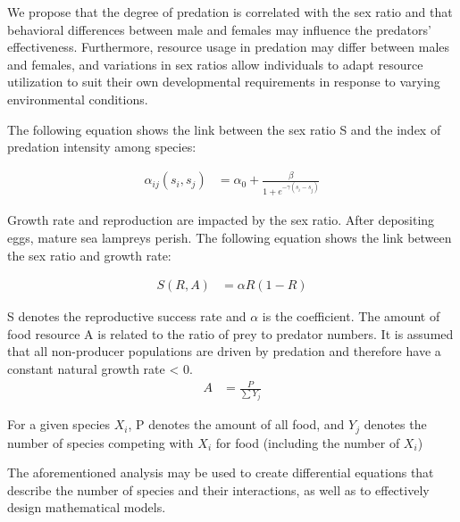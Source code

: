 \documentclass[12pt]{article}  %
\begin{document}
We propose that the degree of predation is correlated with the sex ratio and that behavioral differences between male and females may influence the predators' effectiveness. Furthermore, resource usage in predation may differ between males and females, and variations in sex ratios allow individuals to adapt resource utilization to suit their own developmental requirements in response to varying environmental conditions.\par
The following equation shows the link between the sex ratio S and the index of predation intensity among species:\par
\begin{equation}
	\begin{aligned}
		\alpha_{ij}(s_i, s_j) &= \alpha_0 + \frac{\beta}{1 + e^{-\gamma(s_i - s_j)}}
	\end{aligned}
\end{equation}
\par
Growth rate and reproduction are impacted by the sex ratio. After depositing eggs, mature sea lampreys perish. The following equation shows the link between the sex ratio and growth rate:\par
\begin{equation}
	\begin{aligned}
	S(R,A) &= \alpha R(1-R)
	\end{aligned}
\end{equation}
\par
S denotes the reproductive success rate and $\alpha$ is the coefficient. The amount of food resource A is related to the ratio of prey to predator numbers. It is assumed that all non-producer populations are driven by predation and therefore have a constant natural growth rate < 0. 
\begin{equation}
	\begin{aligned}
		A&=\frac{P}{\sum Y_j}
	\end{aligned}
\end{equation}
\par
For a given species $X_i$, P denotes the amount of all food, and $Y_j$ denotes the number of species competing with $X_i$ for food (including the number of $X_i$)
\par
The aforementioned analysis may be used to create differential equations that describe the number of species and their interactions, as well as to effectively design mathematical models.
\par
\end{document}
